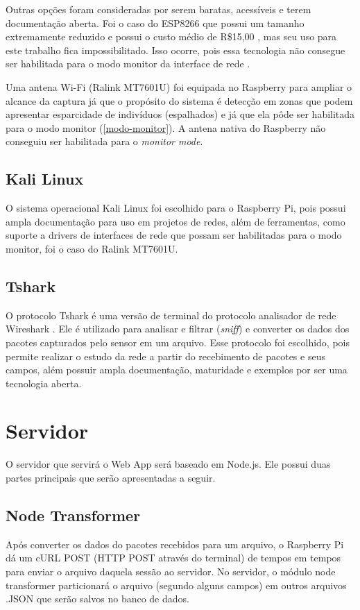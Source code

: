 Outras opções foram consideradas por serem baratas, acessíveis e terem documentação aberta. Foi o caso do ESP8266 que possui um tamanho extremamente
reduzido e possui o custo médio de R\$15,00 \cite{Embarcados2015}, mas seu uso para este trabalho fica impossibilitado. Isso
ocorre, pois essa tecnologia não consegue ser habilitada para o modo monitor da interface de rede \cite{Puhl2016} \cite{Ferreira2016}.

Uma antena Wi-Fi (Ralink MT7601U) foi equipada no Raspberry para ampliar o alcance da captura já que o propósito do sistema é detecção em zonas que podem
apresentar esparcidade de indivíduos (espalhados) e já que ela pôde ser habilitada para o modo monitor (\autoref{modo-monitor}). A antena nativa
do Raspberry não conseguiu ser habilitada para o \emph{monitor mode}.

\subsection{Kali Linux}
O sistema operacional Kali Linux \cite{kali} foi escolhido para o Raspberry Pi, pois possui ampla documentação
para uso em projetos de redes, além de ferramentas, como suporte a drivers de interfaces de rede que possam
ser habilitadas para o modo monitor, foi o caso do Ralink MT7601U.

\subsection{Tshark}
O protocolo Tshark é uma versão de terminal do protocolo
analisador de rede Wireshark \cite{Wireshark2017} \cite{Wireshark2017a}. Ele é
utilizado para analisar e filtrar (\emph{sniff}) e converter os dados dos
pacotes capturados pelo sensor em um arquivo. Esse protocolo foi
escolhido, pois permite realizar o estudo da rede a partir do recebimento de
pacotes e seus campos, além possuir ampla documentação, maturidade e exemplos
por ser uma tecnologia aberta.

\section{Servidor}
O servidor que servirá o Web App será baseado em Node.js. Ele possui duas partes principais que serão apresentadas a seguir.

\subsection{Node Transformer}
\label{node-transformer}
Após converter os dados do pacotes recebidos para um arquivo, o
Raspberry Pi dá um cURL POST (HTTP POST através do terminal) de tempos em tempos
para enviar o arquivo daquela sessão ao servidor. No servidor, o módulo
node transformer particionará o arquivo (segundo alguns campos) em outros
arquivos .JSON que serão salvos no banco de dados.

